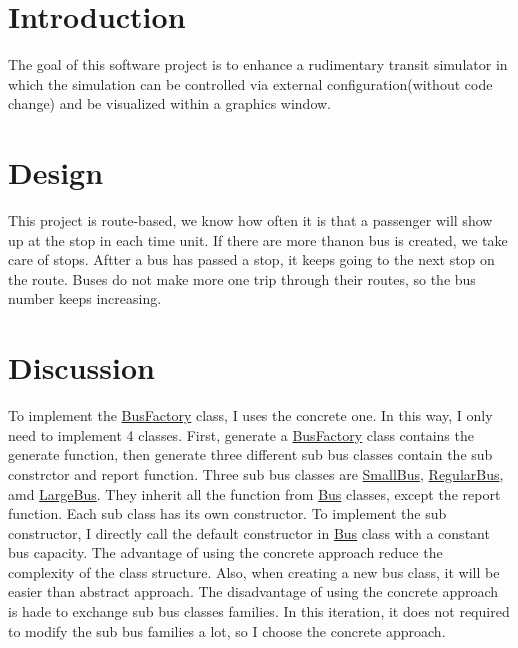 \hypertarget{index_intro_sec}{}\section{Introduction}\label{index_intro_sec}
The goal of this software project is to enhance a rudimentary transit simulator in which the simulation can be controlled via external configuration(without code change) and be visualized within a graphics window.~\newline
\hypertarget{index_design_sec}{}\section{Design}\label{index_design_sec}
This project is route-\/based, we know how often it is that a passenger will show up at the stop in each time unit. If there are more thanon bus is created, we take care of stops. Aftter a bus has passed a stop, it keeps going to the next stop on the route. Buses do not make more one trip through their routes, so the bus number keeps increasing. \hypertarget{index_Discussion}{}\section{Discussion}\label{index_Discussion}
To implement the \hyperlink{classBusFactory}{Bus\+Factory} class, I uses the concrete one. In this way, I only need to implement 4 classes. First, generate a \hyperlink{classBusFactory}{Bus\+Factory} class contains the generate function, then generate three different sub bus classes contain the sub constrctor and report function. Three sub bus classes are \hyperlink{classSmallBus}{Small\+Bus}, \hyperlink{classRegularBus}{Regular\+Bus}, amd \hyperlink{classLargeBus}{Large\+Bus}. They inherit all the function from \hyperlink{classBus}{Bus} classes, except the report function. Each sub class has its own constructor. To implement the sub constructor, I directly call the default constructor in \hyperlink{classBus}{Bus} class with a constant bus capacity. The advantage of using the concrete approach reduce the complexity of the class structure. Also, when creating a new bus class, it will be easier than abstract approach. The disadvantage of using the concrete approach is hade to exchange sub bus classes families. In this iteration, it does not required to modify the sub bus families a lot, so I choose the concrete approach.~\newline
~\newline

